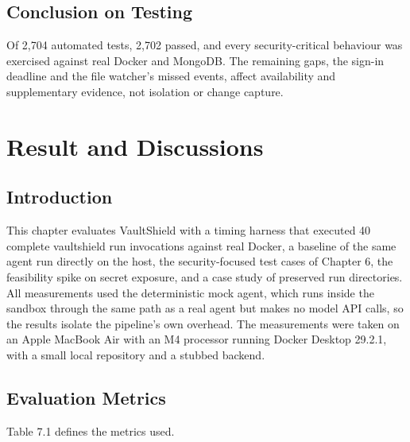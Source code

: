 \documentclass[12pt,a4paper,oneside]{report}
\begin{document}
\section{Conclusion on Testing}\label{conclusion-on-testing}

Of 2,704 automated tests, 2,702 passed, and every security-critical behaviour was exercised against real Docker and MongoDB. The remaining gaps, the sign-in deadline and the file watcher's missed events, affect availability and supplementary evidence, not isolation or change capture.

\clearpage

\chapter{Result and Discussions}\label{results-and-analysis}

\section{Introduction}\label{introduction-1}

This chapter evaluates VaultShield with a timing harness that executed 40 complete vaultshield run invocations against real Docker, a baseline of the same agent run directly on the host, the security-focused test cases of Chapter 6, the feasibility spike on secret exposure, and a case study of preserved run directories. All measurements used the deterministic mock agent, which runs inside the sandbox through the same path as a real agent but makes no model API calls, so the results isolate the pipeline's own overhead. The measurements were taken on an Apple MacBook Air with an M4 processor running Docker Desktop 29.2.1, with a small local repository and a stubbed backend.

\section{Evaluation Metrics}\label{evaluation-metrics}

Table 7.1 defines the metrics used.
\end{document}
